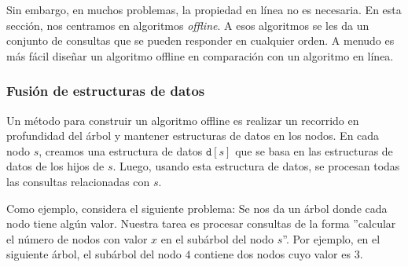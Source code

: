 Sin embargo, en muchos problemas, la propiedad
en línea no es necesaria.
En esta sección, nos centramos en algoritmos \emph{offline}.
A esos algoritmos se les da un conjunto de consultas que se pueden
responder en cualquier orden.
A menudo es más fácil diseñar un algoritmo offline
en comparación con un algoritmo en línea.

\subsubsection{Fusión de estructuras de datos}

Un método para construir un algoritmo offline
es realizar un recorrido en profundidad del árbol
y mantener estructuras de datos en los nodos.
En cada nodo $s$, creamos una estructura de datos
$\texttt{d}[s]$ que se basa en las
estructuras de datos de los hijos de $s$.
Luego, usando esta estructura de datos,
se procesan todas las consultas relacionadas con $s$.

Como ejemplo, considera el siguiente problema:
Se nos da un árbol donde cada nodo tiene algún valor.
Nuestra tarea es procesar consultas de la forma
''calcular el número de nodos con valor $x$
en el subárbol del nodo $s$''.
Por ejemplo, en el siguiente árbol,
el subárbol del nodo $4$ contiene dos nodos
cuyo valor es 3.

\begin{center}
\end{center}

